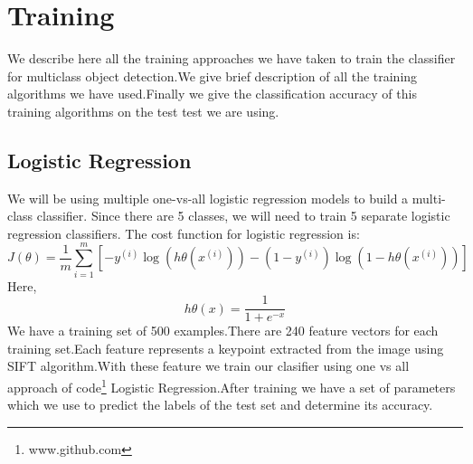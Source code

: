 \documentclass[10pt,twocolumn,letterpaper]{article}
\begin{document}
\section{Training}
We describe here all the training approaches we have taken to train the classifier for multiclass object detection.We give brief description of all the training algorithms we have used.Finally we give the classification accuracy of this training algorithms on the test test we are using.
\subsection{Logistic Regression}
We will be using multiple one-vs-all logistic regression models to build a
multi-class classifier. Since there are 5
classes, we will need to train 5 separate logistic regression classifiers.
The cost function for logistic regression is:$$ J(\theta)=\frac{1}{m}\sum\limits_{i=1}^m[-y^{(i)}\log(h\theta(x^{(i)}))-(1-y^{(i)})\log(1-h\theta(x^{(i)}))] $$
Here,
$$ h\theta(x)=\frac{1}{1 + e^{-x}} $$
We have a training set of 500 examples.There are 240 feature vectors for each training set.Each feature represents a keypoint extracted from the image using SIFT algorithm.With these feature we train our clasifier using one vs all approach of code\footnote{www.github.com} Logistic Regression.After training we have a set of parameters which we use to predict the labels of the test set and determine its accuracy.
\end{document}
